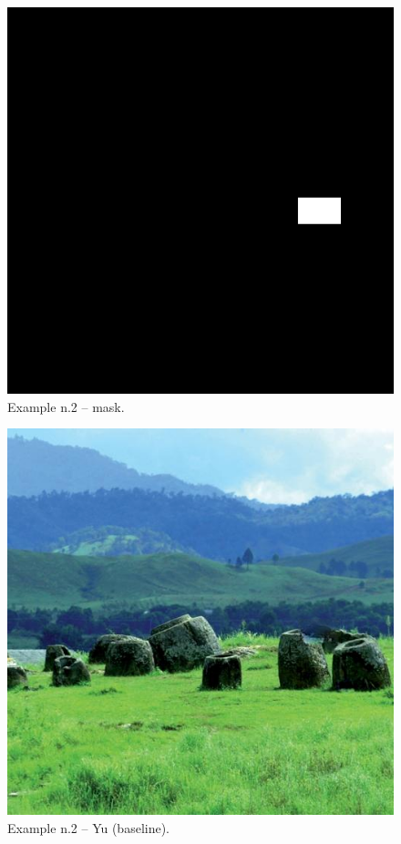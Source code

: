 \documentclass[a4paper, 11pt]{article}
\begin{document}
\begin{figure}
    \centering
    \includegraphics[width=.95\linewidth]{documentation/img/masks/0008_mask.png}
    \caption{Example n.2 -- mask.}
    \label{img:ex_n.2_mask}
\end{figure}
\begin{figure}
    \centering
    \includegraphics[width=.95\linewidth]{documentation/img/baseline/0008.png}
    \caption{Example n.2 -- Yu (baseline).}
    \label{img:ex_n.2_mask}
\end{figure}
\end{document}
